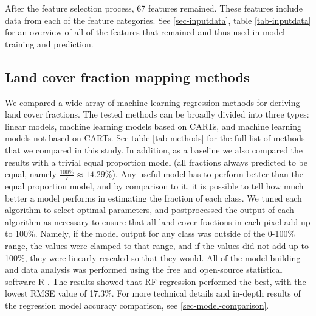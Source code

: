 \documentclass[review,authoryear,3p]{elsarticle}
\begin{document}
After the feature selection process, 67 features remained.
These features include data from each of the feature categories.
See \ref{sec-inputdata}, table \ref{tab-inputdata} for an overview of all of the features that remained and thus used in model training and prediction.

\subsection{Land cover fraction mapping methods}

We compared a wide array of machine learning regression methods for deriving land cover fractions.
The tested methods can be broadly divided into three types: linear models, machine learning models based on \glspl{CART}, and machine learning models not based on \glspl{CART}.
See table \ref{tab-methods} for the full list of methods that we compared in this study.
In addition, as a baseline we also compared the results with a trivial equal proportion model (all fractions always predicted to be equal, namely $\frac{100\%}{7}\approx14.29\%$).
Any useful model has to perform better than the equal proportion model, and by comparison to it, it is possible to tell how much better a model performs in estimating the fraction of each class.
We tuned each algorithm to select optimal parameters, and postprocessed the output of each algorithm as necessary to ensure that all land cover fractions in each pixel add up to 100\%.
Namely, if the model output for any class was outside of the 0-100\% range, the values were clamped to that range, and if the values did not add up to 100\%, they were linearly rescaled so that they would.
All of the model building and data analysis was performed using the free and open-source statistical software R \citep{r_2019}.
The results showed that \gls{RF} regression performed the best, with the lowest \gls{RMSE} value of 17.3\%.
For more technical details and in-depth results of the regression model accuracy comparison, see \ref{sec-model-comparison}.
\end{document}
